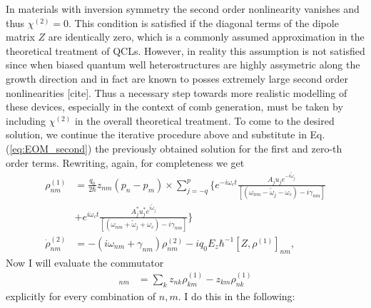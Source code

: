 \documentclass[preprint,secnumarabic,amssymb, nobibnotes, aip, prd]{revtex4-1}
\def\tw{\tilde{\omega}}
\def\tw{\tilde{\omega}}
\begin{document}
	In materials with inversion symmetry the second order nonlinearity vanishes and thus $\chi^{(2)} = 0.$ This condition is satisfied if the diagonal terms of the dipole matrix $Z$ are identically zero, which is a commonly assumed approximation in the theoretical treatment of QCLs. However, in reality this assumption is not satisfied since when biased quantum well heterostructures are highly assymetric along the growth direction and in fact are known to posses extremely large second order nonlinearities [cite]. Thus a necessary step towards more realistic modelling of these devices, especially in the context of comb generation, must be taken by including $\chi^{(2)}$ in the overall theoretical treatment. 
	To come to the desired solution, we continue the iterative procedure above and substitute in Eq. (\ref{eq:EOM_second}) the previously obtained solution for the first and zero-th order terms. Rewriting, again, for completeness we get 
	\begin{align}
	\rho_{nm}^{(1)} &= \frac{q_0}{2\hbar}z_{nm}(p_n-p_m)\times \sum_{j=-q}^{p} \Big \{e^{-i\omega_c t}\frac{A_ju_j e^{-i\tw_j}}{[( \omega_{nm} - \tw_j-\omega_c) -i\gamma_{nm}]} \nonumber \\
	&+e^{i\omega_c t}\frac{A_j^*u_j^* e^{i\tw_j}}{[( \omega_{nm} + \tw_j+\omega_c) -i\gamma_{nm}]}
	\Big \} \nonumber \\ 
	\dot{\rho}_{nm}^{(2)} &= -(i\omega_{nm}+\gamma_{nm})\rho_{nm}^{(2)}  - i q_0E_z\hbar^{-1}[Z,\rho^{(1)}]_{nm},  \label{eq:EOM_second-2}
	\end{align}
	Now I will evaluate the commutator 
	\begin{align}
	[Z,\rho^{(1)}]_{nm} &= \sum_{k} z_{nk}\rho_{km}^{(1)} - z_{km}\rho_{nk}^{(1)}
	\end{align}
	explicitly for every combination of $n,m$. I do this in the following:
\end{document}
